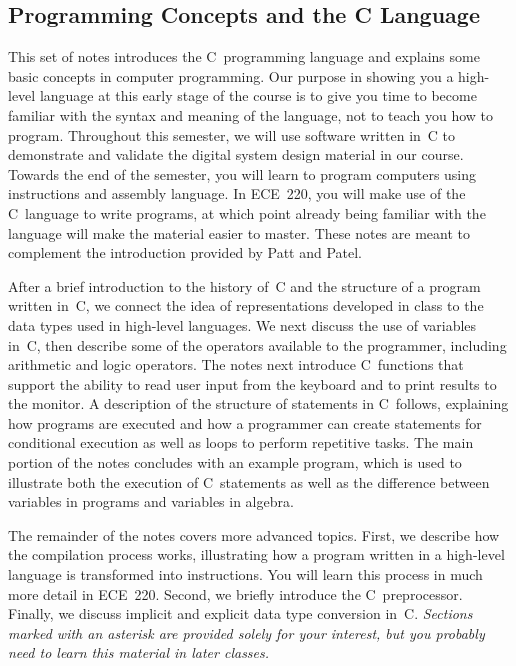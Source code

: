 \classtitle

\subsection{Programming Concepts and the C Language}

This set of notes introduces the C~programming language and explains
some basic concepts in computer programming.  Our purpose in showing
you a high-level language at this early stage of the course is to give
you time to become familiar with the syntax and meaning of the language,
not to teach you how to program.  Throughout this semester, we will
use software written in~C to demonstrate and validate the digital system design
material in our course.  Towards the end of the semester, you will
learn to program computers using instructions and assembly language.
In ECE~220, you will make use of the C~language to write
programs, at which point already being familiar with the language will
make the material easier to master.  
%
These notes are meant to complement the
introduction provided by Patt and Patel.

After a brief introduction to the history of~C and the structure of
a program written in~C, we connect the idea of representations developed 
in class to the data types used in high-level languages.
%
We next discuss the use of variables in~C, then describe some of the 
operators available to the programmer, including arithmetic and logic
operators.  The notes next introduce C~functions that support the ability to
read user input from the keyboard and to print results to the monitor.
%
A description of the structure of statements in C~follows, explaining
how programs are executed and how a programmer can create statements
for conditional execution as well as loops to perform repetitive tasks.
%
The main portion of the notes concludes with 
an example program, which is used to illustrate both the execution of 
C~statements as well as the difference between variables in programs
and variables in algebra.

The remainder of the notes covers more advanced topics.  First, we 
describe how the compilation process works,
illustrating how a program written in a high-level language is
transformed into instructions.  You will learn this process in much
more detail in ECE~220.  
%
Second, we briefly introduce the C~preprocessor.
%
Finally, we discuss implicit and explicit data type conversion in~C.
%
{\em Sections marked with an asterisk are provided solely for your
interest, but you probably need to learn this material in later classes.}\\



